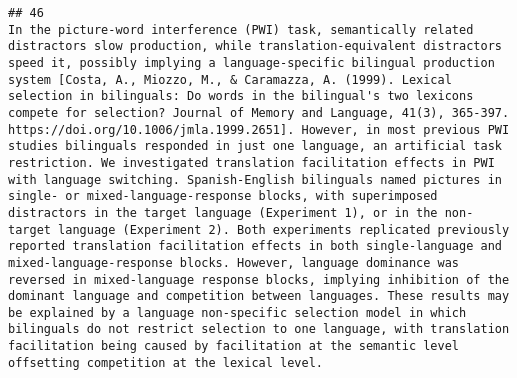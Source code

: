 \documentclass[
  english,
  man]{apa6}
\begin{document}
\begin{verbatim}
## 46                                                                                                                                                                                                                                                                                                                                                                                                                                                                                                                                                                                                                                                                                                                                                                                                                                                                                                                                                                                                                                                                                                                                                                                                                In the picture-word interference (PWI) task, semantically related distractors slow production, while translation-equivalent distractors speed it, possibly implying a language-specific bilingual production system [Costa, A., Miozzo, M., & Caramazza, A. (1999). Lexical selection in bilinguals: Do words in the bilingual's two lexicons compete for selection? Journal of Memory and Language, 41(3), 365-397. https://doi.org/10.1006/jmla.1999.2651]. However, in most previous PWI studies bilinguals responded in just one language, an artificial task restriction. We investigated translation facilitation effects in PWI with language switching. Spanish-English bilinguals named pictures in single- or mixed-language-response blocks, with superimposed distractors in the target language (Experiment 1), or in the non-target language (Experiment 2). Both experiments replicated previously reported translation facilitation effects in both single-language and mixed-language-response blocks. However, language dominance was reversed in mixed-language response blocks, implying inhibition of the dominant language and competition between languages. These results may be explained by a language non-specific selection model in which bilinguals do not restrict selection to one language, with translation facilitation being caused by facilitation at the semantic level offsetting competition at the lexical level.

\end{verbatim}
\end{document}
